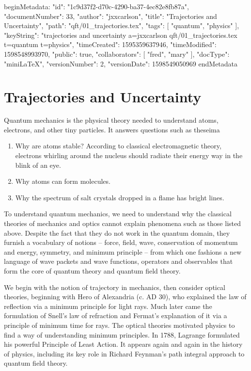 beginMetadata:
{
    "id": "1c9d37f2-d70c-4290-ba37-4ec82e8fb87a",
    "documentNumber": 33,
    "author": "jxxcarlson",
    "title": "Trajectories and Uncertainty",
    "path": "qft/01_trajectories.tex",
    "tags": [
        "quantum",
        "physics"
    ],
    "keyString": "trajectories and uncertainty a=jxxcarlson qft/01_trajectories.tex t=quantum t=physics",
    "timeCreated": 1595359637946,
    "timeModified": 1598548993970,
    "public": true,
    "collaborators": [
        "fred",
        "mary"
    ],
    "docType": "miniLaTeX",
    "versionNumber": 2,
    "versionDate": 1598549050969
}
endMetadata

\maintableofcontents


\section{Trajectories and Uncertainty}


\innertableofcontents


Quantum mechanics is the physical theory needed to understand atoms, electrons, and other tiny particles.  It answers questions such as theseima

\begin{enumerate}
\item Why are atoms stable? According to classical electromagnetic theory, electrons whirling around the nucleus should radiate their energy way in the blink of an eye.

\item Why atoms can form molecules.

\item Why the spectrum of salt crystals dropped in a flame has bright lines.
\end{enumerate}

To understand quantum mechanics, we need to understand why the classical theories of mechanics and optics cannot explain phenomena such as those listed above.  Despite the fact that they do not work in the quantum domain, they furnish a vocabulary of notions -- force, field, wave, conservation of momentum and energy, symmetry, and minimum principle -- from which one fashions a new language of wave packets and wave functions, operators and observables that form the core of quantum theory and quantum field theory.

We begin with the notion of trajectory in mechanics, then consider optical theories, beginning with Hero of Alexandria (c. AD 30), who explained the law of reflection via a minimum principle for light rays.  Much later came the formulation of Snell's law of refraction and Fermat's explanation of it via a principle of minimum time for rays.  The optical theories motivated physics to find a way of understanding minimum principles.  In 1788, Lagrange formulated his powerful Principle of Least Action. It appears again and again in the history of physics, including its key role in Richard Feynman's path integral approach to quantum field theory. 

